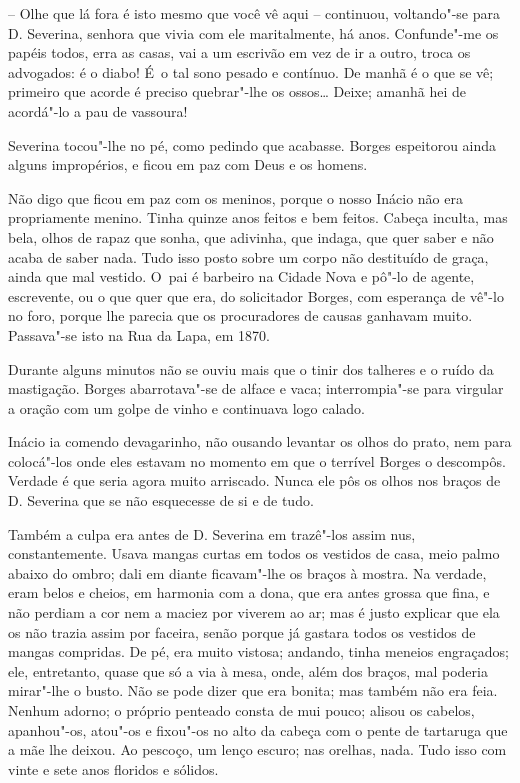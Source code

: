 -- Olhe que lá fora é isto mesmo que você vê aqui -- continuou,
voltando"-se para D. Severina, senhora que vivia com ele maritalmente, há
anos. Confunde"-me os papéis todos, erra as casas, vai a um escrivão em
vez de ir a outro, troca os advogados: é o diabo! É~o tal sono pesado e
contínuo. De manhã é o que se vê; primeiro que acorde é preciso
quebrar"-lhe os ossos\ldots{} Deixe; amanhã hei de acordá"-lo a pau de
vassoura!

Severina tocou"-lhe no pé, como pedindo que acabasse. Borges espeitorou
ainda alguns impropérios, e ficou em paz com Deus e os homens.

Não digo que ficou em paz com os meninos, porque o nosso Inácio não era
propriamente menino. Tinha quinze anos feitos e bem feitos. Cabeça
inculta, mas bela, olhos de rapaz que sonha, que adivinha, que indaga,
que quer saber e não acaba de saber nada. Tudo isso posto sobre um corpo
não destituído de graça, ainda que mal vestido. O~pai é barbeiro na
Cidade Nova e pô"-lo de agente, escrevente, ou o que quer que era, do
solicitador Borges, com esperança de vê"-lo no foro, porque lhe parecia
que os procuradores de causas ganhavam muito. Passava"-se isto na Rua da
Lapa, em 1870.

Durante alguns minutos não se ouviu mais que o tinir dos talheres e o
ruído da mastigação. Borges abarrotava"-se de alface e vaca;
interrompia"-se para virgular a oração com um golpe de vinho e continuava
logo calado.

Inácio ia comendo devagarinho, não ousando levantar os olhos do prato,
nem para colocá"-los onde eles estavam no momento em que o terrível
Borges o descompôs. Verdade é que seria agora muito arriscado. Nunca ele
pôs os olhos nos braços de D. Severina que se não esquecesse de si e de
tudo.

Também a culpa era antes de D. Severina em trazê"-los assim nus,
constantemente. Usava mangas curtas em todos os vestidos de casa, meio
palmo abaixo do ombro; dali em diante ficavam"-lhe os braços à mostra. Na
verdade, eram belos e cheios, em harmonia com a dona, que era antes
grossa que fina, e não perdiam a cor nem a maciez por viverem ao ar; mas
é justo explicar que ela os não trazia assim por faceira, senão porque
já gastara todos os vestidos de mangas compridas. De pé, era muito
vistosa; andando, tinha meneios engraçados; ele, entretanto, quase que
só a via à mesa, onde, além dos braços, mal poderia mirar"-lhe o busto.
Não se pode dizer que era bonita; mas também não era feia. Nenhum
adorno; o próprio penteado consta de mui pouco; alisou os cabelos,
apanhou"-os, atou"-os e fixou"-os no alto da cabeça com o pente de
tartaruga que a mãe lhe deixou. Ao pescoço, um lenço escuro; nas
orelhas, nada. Tudo isso com vinte e sete anos floridos e sólidos.

